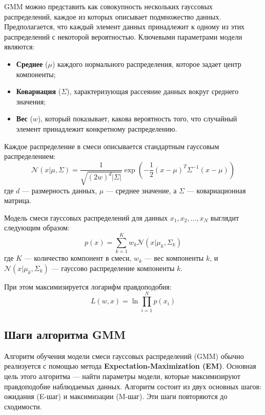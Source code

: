 GMM можно представить как совокупность нескольких гауссовых распределений, каждое из которых описывает подмножество данных. Предполагается, что каждый элемент данных принадлежит к одному из этих распределений с некоторой вероятностью. Ключевыми параметрами модели являются:
\begin{itemize}
    \item \textbf{Среднее} ($\mu$) каждого нормального распределения, которое задает центр компоненты;
    \item \textbf{Ковариация} ($\Sigma$), характеризующая рассеяние данных вокруг среднего значения;
    \item \textbf{Вес} ($w$), который показывает, какова вероятность того, что случайный элемент принадлежит конкретному распределению.
\end{itemize}

Каждое распределение в смеси описывается стандартным гауссовым распределением:
\[
\mathcal{N}(x | \mu, \Sigma) = \frac{1}{\sqrt{(2 w)^d |\Sigma|}} \exp \left( -\frac{1}{2} (x - \mu)^T \Sigma^{-1} (x - \mu) \right)
\]
где $d$ — размерность данных, $\mu$ — среднее значение, а $\Sigma$ — ковариационная матрица.

Модель смеси гауссовых распределений для данных $x_1, x_2, \dots, x_N$ выглядит следующим образом:
\[
p(x) = \sum_{k=1}^{K} w_k \mathcal{N}(x | \mu_k, \Sigma_k)
\]
где $K$ — количество компонент в смеси, $w_k$ — вес компоненты $k$, и $\mathcal{N}(x | \mu_k, \Sigma_k)$ — гауссово распределение компоненты $k$.

При этом максимизируется логарифм правдоподобия:
\[
L(w, x) = \ln \prod_{i=1}^N p(x_i)
\]


\subsection{Шаги алгоритма GMM}

Алгоритм обучения модели смеси гауссовых распределений (GMM) обычно реализуется с помощью метода \textbf{Expectation-Maximization (EM)}. Основная цель этого алгоритма — найти параметры модели, которые максимизируют правдоподобие наблюдаемых данных. Алгоритм состоит из двух основных шагов: ожидания (E-шаг) и максимизации (M-шаг). Эти шаги повторяются до сходимости.

